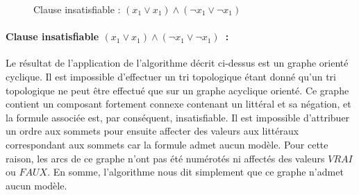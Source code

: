 \documentclass{article}
\begin{document}
\begin{figure}[h!]
  \centering
  \caption{Clause insatisfiable : $(x_{1} \vee x_{1}) \wedge (\neg x_{1} \vee \neg x_{1})$}
  \label{fig:clause-insat}
\end{figure}

\paragraph*{Clause insatisfiable $(x_{1} \vee x_{1}) \wedge (\neg x_{1} \vee \neg x_{1})$~:}

Le résultat de l'application de l'algorithme décrit ci-dessus est un graphe orienté cyclique. Il est impossible d'effectuer un tri topologique étant donné qu'un tri topologique ne peut être effectué que sur un graphe acyclique orienté. Ce graphe contient un composant fortement connexe contenant un littéral et sa négation, et la formule associée est, par conséquent, insatisfiable. Il est impossible d'attribuer un ordre aux sommets pour ensuite affecter des valeurs aux littéraux correspondant aux sommets car la formule admet aucun modèle. Pour cette raison, les arcs de ce graphe n'ont pas été numérotés ni affectés des valeurs $VRAI$ ou $FAUX$. En somme, l'algorithme nous dit simplement que ce graphe n'admet aucun modèle.
\end{document}
